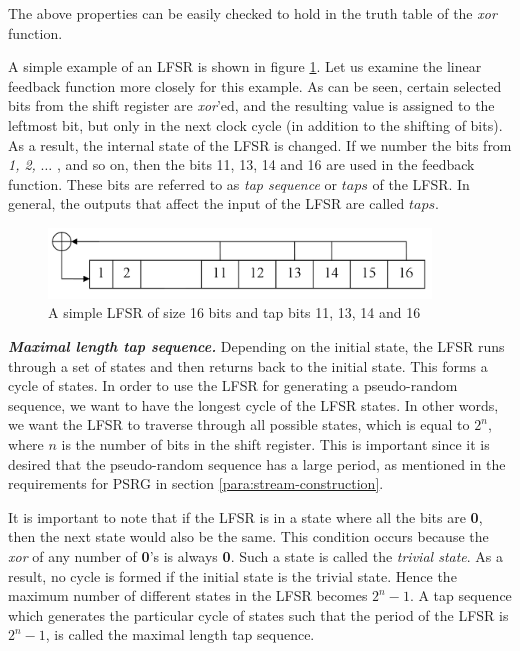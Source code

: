 The above properties can be easily checked to hold in the truth table of the \emph{xor} function.

A simple example of an LFSR is shown in figure \ref{fig:lfsr-example1}. Let us examine the linear feedback function more closely for this example. As can be seen, certain selected bits from the shift register are \emph{xor}'ed, and the resulting value is assigned to the leftmost bit, but only in the next clock cycle (in addition to the shifting of bits). As a result, the internal state of the LFSR is changed. If we number the bits from \emph{1, 2,} $\ldots$ , and so on, then the bits 11, 13, 14 and 16 are used in the feedback function. These bits are referred to as \emph{tap sequence} or $taps$ of the LFSR. In general, the outputs that affect the input of the LFSR are called $taps$.\\


\begin{figure}[ht!]
	\centering
		\includegraphics[width=4in]{./figures/lfsr-example.PNG}
	\caption{A simple LFSR of size 16 bits and tap bits 11, 13, 14 and 16}	
	\label{fig:lfsr-example1}
\end{figure}

\noindent \textit{\textbf{Maximal length tap sequence.}} Depending on the initial state, the LFSR runs through a set of states and then returns back to the initial state. This forms a cycle of states. In order to use the LFSR for generating a pseudo-random sequence, we want to have the longest cycle of the LFSR states. In other words, we want the LFSR to traverse through all possible states, which is equal to $2^n$, where $n$ is the number of bits in the shift register. This is important since it is desired that the pseudo-random sequence has a large period, as mentioned in the requirements for PSRG in section \ref{para:stream-construction}.

It is important to note that if the LFSR is in a state where all the bits are \textbf{0}, then the next state would also be the same. This condition occurs because the \textit{xor} of any number of \textbf{0}'s is always \textbf{0}. Such a state is called the \textit{trivial state}. As a result, no cycle is formed if the initial state is the trivial state. Hence the maximum number of different states in the LFSR becomes $2^n-1$. A tap sequence which generates the particular cycle of states such that the period of the LFSR is $2^n-1$, is called the maximal length tap sequence. 

